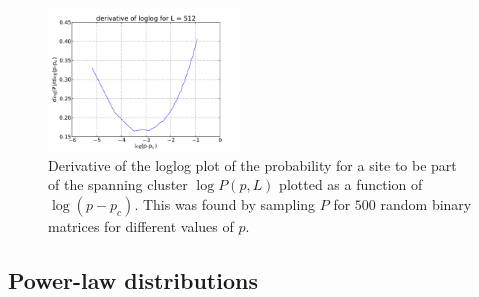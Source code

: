 \documentclass[a4paper,reprint,floatfix,amsmath,amssymb,aps,pra]{revtex4-1}
\begin{document}
\begin{figure}
  \centering
  \includegraphics[width=0.45\textwidth]{../percolation/results/1a/P-vs-p-L512-nsamples500-loglogderivative.pdf}
  \caption{Derivative of the loglog plot of the probability for a site to be part of the spanning cluster $\log P(p,L)$ plotted as a function of $\log (p-p_{c})$. This was found by sampling $P$ for $500$ random binary matrices for different values of $p$.}
  \label{fig:logP-vs-logp-derivative}
\end{figure}

\subsection{Power-law distributions}
\end{document}
